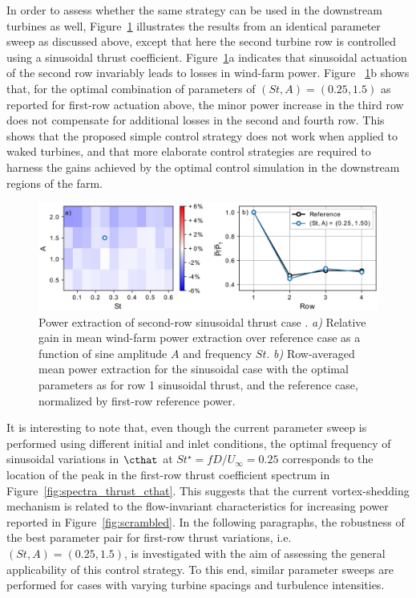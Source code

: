 In order to assess whether the same strategy can be used in the downstream turbines as well, Figure~\ref{fig:sinus_row2} illustrates the results from an identical parameter sweep as discussed above, except that here the second turbine row is controlled using a sinusoidal thrust coefficient. Figure~\ref{fig:sinus_row2}a indicates that sinusoidal actuation of the second row invariably leads to losses in wind-farm power. Figure ~\ref{fig:sinus_row2}b  shows that, for the optimal combination of parameters of  $(St, A) = (0.25, 1.5)$ as reported for first-row actuation above, the minor power increase in the third row does not compensate for additional losses in the second and fourth row. This shows that the proposed simple control strategy does not work when applied to waked turbines, and that more elaborate control strategies are required to harness the gains achieved by the optimal control simulation in the downstream regions of the farm. 
\begin{figure}
	\centering
	\includegraphics[width=\textwidth]{chapters/analysis_induction_control/gains_row22.eps}
	\caption{Power extraction of second-row sinusoidal thrust case . \emph{a) } Relative gain in mean wind-farm power extraction over reference case as a function of sine amplitude $A$ and frequency $St$. \emph{b) } Row-averaged mean power extraction for the sinusoidal case with the optimal parameters as for row 1 sinusoidal thrust, and the reference case, normalized by first-row reference power.\label{fig:sinus_row2} }
\end{figure}

It is interesting to note that, even though the current parameter sweep is performed using different initial and inlet conditions, the optimal frequency of sinusoidal variations in $\cthat$ at $St^\star = f D / U_\infty = 0.25$ corresponds to the location of the peak in the first-row thrust coefficient spectrum in Figure~\ref{fig:spectra_thrust_cthat}. This suggests that the current vortex-shedding mechanism is related to the flow-invariant characteristics for increasing power reported in Figure~\ref{fig:scrambled}. 
In the following paragraphs, the robustness of the best parameter pair for first-row thrust variations, i.e. $(St, A) = (0.25, 1.5)$, is investigated with the aim of assessing the general applicability of this control strategy. To this end, similar parameter sweeps are performed for cases with varying turbine spacings and turbulence intensities.


